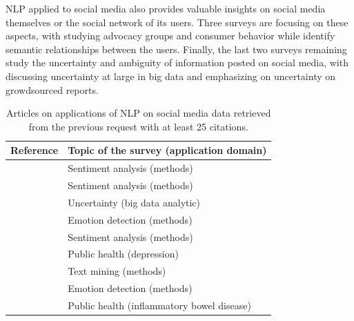 NLP applied to social media also provides valuable insights on social media themselves or the social network of its users.
Three surveys are focusing on these aspects, with \textcite{bailCombiningNaturalLanguage2016} studying advocacy groups and \textcite{vazquezClassificationUsergeneratedContent2014} consumer behavior while \textcite{bontchevaMakingSenseSocial2014} identify semantic relationships between the users.
Finally, the last two surveys remaining study the uncertainty and ambiguity of information posted on social media, with \textcite{haririUncertaintyBigData2019} discussing uncertainty at large in big data and \textcite{linUncertaintyAnalysisCrowdsourced2015} emphasizing on uncertainty on growdsourced reports.

\begin{table}[bht]
    \centering
    \tabulinesep=1.2mm
    \caption{Articles on applications of NLP on social media data retrieved from the previous request with at least 25 citations.}
    \begin{tabu} to \textwidth {X[1,m]X[3,m]}
        Reference                                                & Topic of the survey  (application domain)   \\ [0.5ex]
        \toprule
        \textcite{yadavSentimentAnalysisUsing2020}               & Sentiment analysis (methods)                \\
        \textcite{hemmatianSurveyClassificationTechniques2019}   & Sentiment analysis (methods)                \\
        \textcite{haririUncertaintyBigData2019}                  & Uncertainty (big data analytic)             \\
        \textcite{sailunazEmotionDetectionText2018}              & Emotion detection (methods)                 \\
        \textcite{chaturvediDistinguishingFactsOpinions2018}     & Sentiment analysis (methods)                \\
        \textcite{yazdavarSemiSupervisedApproachMonitoring2017}  & Public health (depression)                  \\
        \textcite{salloumSurveyTextMining2017}                   & Text mining (methods)                       \\
        \textcite{poriaReviewAffectiveComputing2017}             & Emotion detection (methods)                 \\
        \textcite{martinezPatientUnderstandingRisks2017}         & Public health (inflammatory bowel disease)  \\

\end{tabu}
\end{table}
